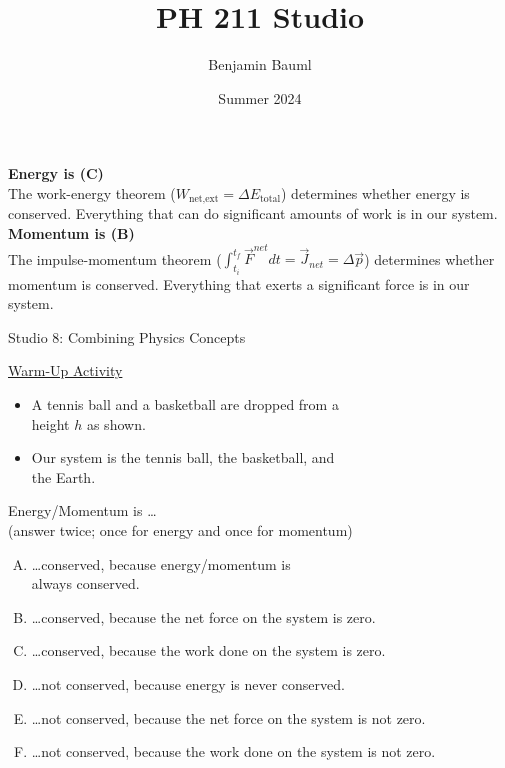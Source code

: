 \documentclass[]{article}
\title{PH 211 Studio \Week}
\author{Benjamin Bauml}
\date{Summer 2024}
\begin{document}
\begin{TeacherMargin}
\noindent\textbf{Energy is (C)} \\
The work-energy theorem ($W_{\text{net,ext}} = \Delta E_{\text{total}}$) determines whether energy is conserved. Everything that can do significant amounts of work is in our system. \\
\textbf{Momentum is (B)} \\
The impulse-momentum theorem ($\int_{t_{i}}^{t_{f}}\vec{F}^{net}dt = \vec{J}_{net} = \Delta\vec{p}$) determines whether momentum is conserved. Everything that exerts a significant force is in our system.
\end{TeacherMargin}
\begin{PresentSpace}
\begin{center}
	\huge Studio 8: Combining Physics Concepts \\
	\vspace{0.5cm}
\end{center}
\underline{Warm-Up Activity}
\begin{itemize}
	\item A tennis ball and a basketball are dropped from a \\
	height $h$ as shown.
	\item Our system is the tennis ball, the basketball, and \\
	the Earth.
\end{itemize}
Energy/Momentum is \dots \\
(answer twice; once for energy and once for momentum)
\begin{enumerate}[(A)]
	\item \dots conserved, because energy/momentum is \\
	\phantom{\dots}always conserved.
	\item \dots conserved, because the net force on the system is zero.
	\item \dots conserved, because the work done on the system is zero.
	\item \dots not conserved, because energy is never conserved.
	\item \dots not conserved, because the net force on the system is not zero.
	\item \dots not conserved, because the work done on the system is not zero.
\end{enumerate}

\end{PresentSpace}
\end{document}
